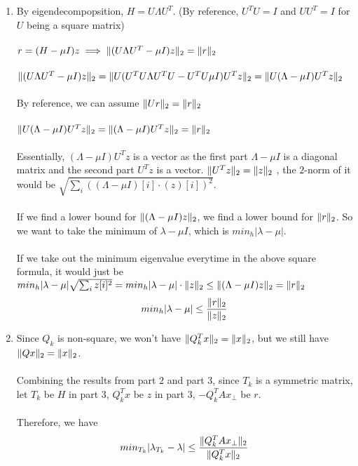 \documentclass[11pt]{article}
\begin{document}
\begin{solution}
\begin{enumerate}
            \item By eigendecompopsition, $H = U\Lambda U^T$. (By reference, $U^TU = I$ and $UU^T = I$ for $U$ being a square matrix)\\
            \\
            $r = (H-\mu I)z \implies \mathopen\| (U\Lambda U^T - \mu I)z \mathclose\|_2 = \mathopen\| r \mathclose\|_2$\\ 
            \\
            $\mathopen\| (U\Lambda U^T - \mu I)z \mathclose\|_2 = \mathopen\| U(U^T U \Lambda U^T U - U^T U \mu I) U^T z \mathclose\|_2 = \mathopen\| U(\Lambda - \mu I)U^T z \mathclose\|_2$\\
            \\
            By reference, we can assume $\mathopen\| Ur \mathclose\|_2 = \mathopen\| r \mathclose\|_2$\\
            \\
            $\mathopen\| U(\Lambda - \mu I)U^T z \mathclose\|_2 = \mathopen\| (\Lambda - \mu I)U^T z \mathclose\|_2 = \mathopen\| r \mathclose\|_2$\\
            \\
            Essentially, $(\Lambda - \mu I)U^T z$ is a vector as the first part $\Lambda - \mu I$ is a diagonal matrix and the second part $U^Tz$ is a vector. $\mathopen\| U^Tz \mathclose\|_2 = \mathopen\| z \mathclose\|_2$ , the $2$-norm of it would be $\sqrt{\sum_i((\Lambda - \mu I)[i] \cdot (z)[i])^2}$.\\
            \\
            If we find a lower bound for $\mathopen\| (\Lambda - \mu I)z \mathclose\|_2$, we find a lower bound for $ \mathopen\| r \mathclose\|_2$. So we want to take the minimum of $\lambda - \mu I$, which is $min_h |\lambda - \mu|$.\\
            \\
            If we take out the minimum eigenvalue everytime in the above square formula, it would just be  $min_h |\lambda - \mu| \sqrt{\sum_i z[i]^2} = min_h |\lambda - \mu| \cdot \mathopen\| z \mathclose\|_2 \leq \mathopen\| (\Lambda - \mu I)z \mathclose\|_2 = \mathopen\| r \mathclose\|_2$
            $$min_h |\lambda - \mu| \leq \frac{\mathopen\| r \mathclose\|_2}{\mathopen\| z \mathclose\|_2}$$

            \item Since $Q_k$ is non-square, we won't have $\mathopen\| Q_k^Tx \mathclose\|_2 = \mathopen\| x \mathclose\|_2$, but we still have $\mathopen\| Qx \mathclose\|_2 = \mathopen\| x \mathclose\|_2$.\\
            \\
            Combining the results from part $2$ and part $3$, since $T_k$ is a symmetric matrix, let $T_k$ be $H$ in part $3$, $Q_k^Tx$ be $z$ in part $3$, $-Q_k^TAx_{\perp}$ be $r$.\\
            \\
            Therefore, we have 
            $$ min_{T_k}|\lambda_{T_k} - \lambda| \leq \frac{\mathopen\| Q_k^TAx_{\perp} \mathclose\|_2}{\mathopen\| Q_k^Tx \mathclose\|_2} $$
            

\end{enumerate}
\end{solution}
\end{document}
